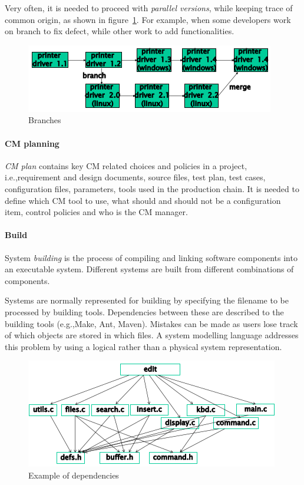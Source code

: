 Very often, it is needed to proceed with \emph{parallel versions}, while keeping trace of common origin, as shown in figure~\ref{img:branches_merges}. For example, when some developers work on branch to fix defect, while other work to add functionalities.

\begin{figure}[hbtp]
\centering
\includegraphics[scale=0.5]{images/branches_merges.png}
\caption{Branches}
\label{img:branches_merges}
\end{figure}

\paragraph{CM planning}
\emph{CM plan} contains key CM related choices and policies in a project, i.e.,\@ requirement and design documents, source files, test plan, test cases, configuration files, parameters, tools used in the production chain. It is needed to define which CM tool to use, what should and should not be a configuration item, control policies and who is the CM manager.

\paragraph{Build}
System \emph{building} is the process of compiling and linking software components into an executable system. Different systems are built from different combinations of components.

Systems are normally represented for building by specifying the filename to be processed by building tools. Dependencies between these are described to the building tools (e.g.,\@ Make, Ant, Maven). Mistakes can be made as users lose track of which objects are stored in which files. A system modelling language addresses this problem by using a logical rather than a physical system representation.

\begin{figure}[hbtp]
\centering
\includegraphics[scale=0.4]{images/dependencies.png}
\caption{Example of dependencies}
\end{figure}


